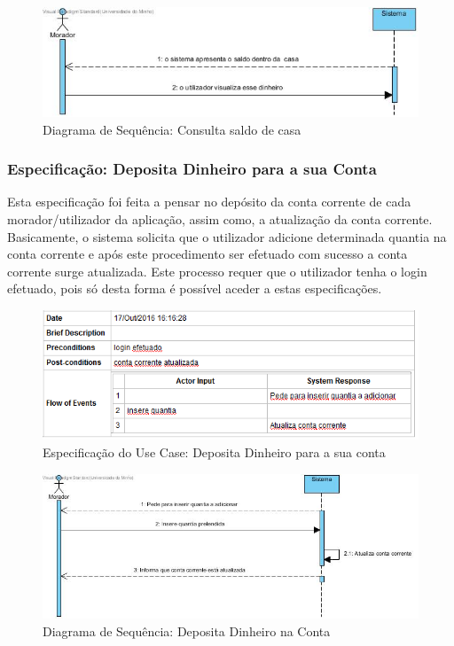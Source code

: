 \begin{figure}[htb!]
	\centering
	\includegraphics[scale=0.5]{imagens/diagramaSeq/ConsultaSaldodeCasa}  
	\caption{Diagrama de Sequência: Consulta saldo de casa  }  
\end{figure}


\subsubsection{Especificação: Deposita Dinheiro para a sua Conta }
Esta especificação foi feita a pensar no depósito da conta corrente de cada morador/utilizador da aplicação, assim como,  a atualização da conta corrente. Basicamente, o sistema solicita que o utilizador adicione determinada quantia na conta corrente e após este procedimento ser efetuado com sucesso a conta corrente surge atualizada. Este processo requer que o utilizador tenha o login efetuado, pois só desta forma é possível aceder a estas especificações.  
\begin{figure}[htb!]
	\centering
	\includegraphics[scale=0.6]{imagens/Especificacoes/depositadinheiro}  
	\caption{Especificação do Use Case: Deposita Dinheiro para a sua conta  }  
\end{figure}

\begin{figure}[htb!]
	\centering
	\includegraphics[scale=0.5]{imagens/diagramaSeq/DepositaDinheiroConta}  
	\caption{Diagrama de Sequência: Deposita Dinheiro na Conta}  
\end{figure}


